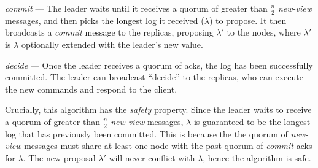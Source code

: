 \textit{commit} --- The leader waits until it receives a quorum of greater than $\frac{n}{2}$ \textit{new-view} messages, and then picks the longest log it received ($\lambda$) to propose. It then broadcasts a \textit{commit} message to the replicas, proposing $\lambda'$ to the nodes, where $\lambda'$ is $\lambda$ optionally extended with the leader's new value.

\textit{decide} --- Once the leader receives a quorum of acks, the log has been successfully committed. The leader can broadcast ``decide'' to the replicas, who can execute the new commands and respond to the client.

Crucially, this algorithm has the \textit{safety} property. Since the leader waits to receive a quorum of greater than $\frac{n}{2}$ \textit{new-view} messages, $\lambda$ is guaranteed to be the longest log that has previously been committed. This is because the the quorum of \textit{new-view} messages must share at least one node with the past quorum of \textit{commit} acks for $\lambda$. The new proposal $\lambda'$ will never conflict with $\lambda$, hence the algorithm is safe.

